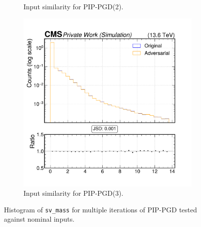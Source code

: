 \begin{figure}[h]
\begin{subfigure}[t]{0.32\textwidth}
    \caption*{Input similarity for PIP-PGD(2).}
  \end{subfigure}\hfill
  \begin{subfigure}[t]{0.32\textwidth}
    \includegraphics[width=\linewidth]{media/output/features/compare/combined_it_3/cmp_vtx_arr_sv_mass.pdf}
    \caption*{Input similarity for PIP-PGD(3).}
  \end{subfigure}

  \caption*{Histogram of \texttt{sv\_mass} for multiple iterations of PIP-PGD tested against nominal inputs.}
  \label{fig:combined_input_sv_mass}
\end{figure}

